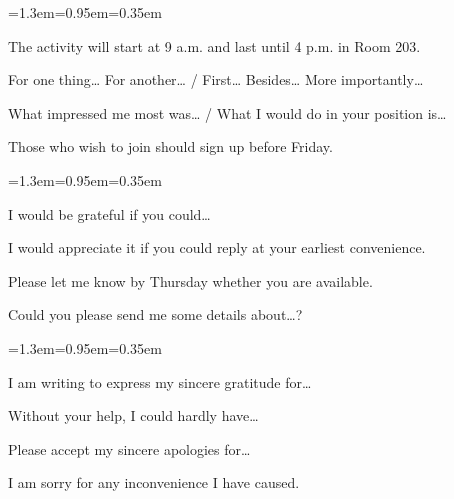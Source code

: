 \documentclass[10pt,a4paper]{ctexart}
\begin{document}
\begin{list}{}{\leftmargin=1.3em=0.95em=0.35em\itemindent=0pt\topsep=0pt\parsep=2pt\itemsep=2pt}
\item[{\color{accent}\scriptsize$\blacktriangleright$}]{\small The activity will start at 9 a.m. and last until 4 p.m. in Room 203.}
\item[{\color{accent}\scriptsize$\blacktriangleright$}]{\small For one thing… For another… / First… Besides… More importantly…}
\item[{\color{accent}\scriptsize$\blacktriangleright$}]{\small What impressed me most was… / What I would do in your position is…}
\item[{\color{accent}\scriptsize$\blacktriangleright$}]{\small Those who wish to join should sign up before Friday.}
\end{list}\vspace{4pt}
\par\vspace{1pt}
\begin{list}{}{\leftmargin=1.3em=0.95em=0.35em\itemindent=0pt\topsep=0pt\parsep=2pt\itemsep=2pt}
\item[{\color{accent}\scriptsize$\blacktriangleright$}]{\small I would be grateful if you could…}
\item[{\color{accent}\scriptsize$\blacktriangleright$}]{\small I would appreciate it if you could reply at your earliest convenience.}
\item[{\color{accent}\scriptsize$\blacktriangleright$}]{\small Please let me know by Thursday whether you are available.}
\item[{\color{accent}\scriptsize$\blacktriangleright$}]{\small Could you please send me some details about…?}
\end{list}\vspace{4pt}
\par\vspace{1pt}
\begin{list}{}{\leftmargin=1.3em=0.95em=0.35em\itemindent=0pt\topsep=0pt\parsep=2pt\itemsep=2pt}
\item[{\color{accent}\scriptsize$\blacktriangleright$}]{\small I am writing to express my sincere gratitude for…}
\item[{\color{accent}\scriptsize$\blacktriangleright$}]{\small Without your help, I could hardly have…}
\item[{\color{accent}\scriptsize$\blacktriangleright$}]{\small Please accept my sincere apologies for…}
\item[{\color{accent}\scriptsize$\blacktriangleright$}]{\small I am sorry for any inconvenience I have caused.}
\end{list}\vspace{4pt}
\end{document}
